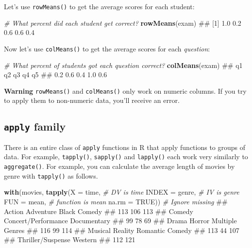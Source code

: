 \documentclass[]{book}
\newenvironment{Shaded}{\begin{snugshade}}{\end{snugshade}}
\newcommand{\KeywordTok}[1]{\textcolor[rgb]{0.13,0.29,0.53}{\textbf{{#1}}}}
\newcommand{\DataTypeTok}[1]{\textcolor[rgb]{0.13,0.29,0.53}{{#1}}}
\newcommand{\CommentTok}[1]{\textcolor[rgb]{0.56,0.35,0.01}{\textit{{#1}}}}
\newcommand{\OtherTok}[1]{\textcolor[rgb]{0.56,0.35,0.01}{{#1}}}
\newcommand{\NormalTok}[1]{{#1}}
\theoremstyle{definition}
\theoremstyle{definition}
\theoremstyle{remark}
\begin{document}
Let's use \texttt{rowMeans()} to get the average scores for each
student:

\begin{Shaded}
\begin{Highlighting}[]
\CommentTok{# What percent did each student get correct?}
\KeywordTok{rowMeans}\NormalTok{(exam)}
\NormalTok{## [1] 1.0 0.2 0.6 0.6 0.4}
\end{Highlighting}
\end{Shaded}

Now let's use \texttt{colMeans()} to get the average scores for each
\emph{question}:

\begin{Shaded}
\begin{Highlighting}[]
\CommentTok{# What percent of students got each question correct?}
\KeywordTok{colMeans}\NormalTok{(exam)}
\NormalTok{##  q1  q2  q3  q4  q5 }
\NormalTok{## 0.2 0.6 0.4 1.0 0.6}
\end{Highlighting}
\end{Shaded}

\textbf{Warning} \texttt{rowMeans()} and \texttt{colMeans()} only work
on numeric columns. If you try to apply them to non-numeric data, you'll
receive an error.

\subsection{\texorpdfstring{\texttt{apply}
family}{apply family}}\label{apply-family}

There is an entire class of \texttt{apply} functions in R that apply
functions to groups of data. For example, \texttt{tapply()},
\texttt{sapply()} and \texttt{lapply()} each work very similarly to
\texttt{aggregate()}. For example, you can calculate the average length
of movies by genre with \texttt{tapply()} as follows.

\begin{Shaded}
\begin{Highlighting}[]
\KeywordTok{with}\NormalTok{(movies, }\KeywordTok{tapply}\NormalTok{(}\DataTypeTok{X =} \NormalTok{time,        }\CommentTok{# DV is time}
                    \DataTypeTok{INDEX =} \NormalTok{genre,   }\CommentTok{# IV is genre}
                    \DataTypeTok{FUN =} \NormalTok{mean,      }\CommentTok{# function is mean}
                    \DataTypeTok{na.rm =} \OtherTok{TRUE}\NormalTok{))   }\CommentTok{# Ignore missing}
\NormalTok{##              Action           Adventure        Black Comedy }
\NormalTok{##                 113                 106                 113 }
\NormalTok{##              Comedy Concert/Performance         Documentary }
\NormalTok{##                  99                  78                  69 }
\NormalTok{##               Drama              Horror     Multiple Genres }
\NormalTok{##                 116                  99                 114 }
\NormalTok{##             Musical             Reality     Romantic Comedy }
\NormalTok{##                 113                  44                 107 }
\NormalTok{##   Thriller/Suspense             Western }
\NormalTok{##                 112                 121}
\end{Highlighting}
\end{Shaded}
\end{document}
